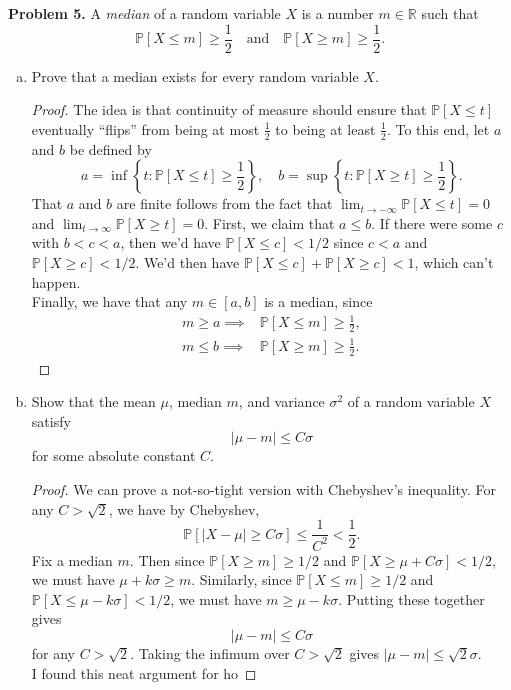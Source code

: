 \documentclass[11pt,letterpaper]{report}
\newcommand{\reals}{\mathbb{R}}
\newcommand{\Prob}{\mathbb{P}}
\begin{document}
\noindent\textbf{Problem 5. }
A \textit{median} of a random variable $X$ is a number $m\in \reals$ such that
\[
\Prob[X\leq m]\geq \frac{1}{2}\quad\text{and}\quad \Prob[X\geq m]\geq \frac{1}{2}.
\]
\begin{enumerate}[(a)]
	\item Prove that a median exists for every random variable $X$.
	\begin{proof}
		The idea is that continuity of measure should ensure that $\Prob[X\leq t]$ eventually ``flips'' from being at most $\frac{1}{2}$ to being at least $\frac{1}{2}$. To this end, let $a$ and $b$ be defined by
		\[
		a = \inf\left\{t: \Prob[X\leq t]\geq \frac{1}{2}\right\},\quad b = \sup\left\{t: \Prob[X\geq t]\geq \frac{1}{2}\right\}.
		\]
		That $a$ and $b$ are finite follows from the fact that $\lim_{t\to -\infty}\Prob[X\leq t] = 0$ and $\lim_{t\to \infty}\Prob[X\geq t] = 0$. First, we claim that $a\leq b$. If there were some $c$ with $b<c<a$, then we'd have $\Prob[X\leq c]< 1/2$ since $c<a$ and $\Prob[X\geq c]<1/2$. We'd then have $\Prob[X\leq c] + \Prob[X\geq c]<1$, which can't happen.\\

		\noindent Finally, we have that any $m\in [a,b]$ is a median, since
		\begin{align*}
			m\geq a\implies & \Prob[X\leq m]\geq \frac{1}{2},\\
			m\leq b\implies & \Prob[X\geq m]\geq \frac{1}{2}.
		\end{align*}
	\end{proof}

	\item Show that the mean $\mu$, median $m$, and variance $\sigma^2$ of a random variable $X$ satisfy
	\[
	|\mu-m|\leq C\sigma
	\]
	for some absolute constant $C$.
	\begin{proof}
		We can prove a not-so-tight version with Chebyshev's inequality. For any $C>\sqrt{2}$, we have by Chebyshev,
		\[
		\Prob[|X-\mu|\geq C\sigma]\leq \frac{1}{C^2}<\frac{1}{2}.
		\]
		Fix a median $m$. Then since $\Prob[X\geq m]\geq 1/2$ and $\Prob[X\geq \mu+C\sigma]<1/2$, we must have $\mu+k\sigma\geq m$. Similarly, since $\Prob[X\leq m]\geq 1/2$ and $\Prob[X\leq \mu-k\sigma]<1/2$, we must have $m\geq \mu-k\sigma$. Putting these together gives
		\[
		|\mu-m|\leq C\sigma
		\]
		for any $C>\sqrt{2}$. Taking the infimum over $C>\sqrt{2}$ gives $|\mu-m|\leq \sqrt{2}\sigma$.\\

		\noindent I found this neat argument for ho
	\end{proof}
\end{enumerate}
\end{document}

